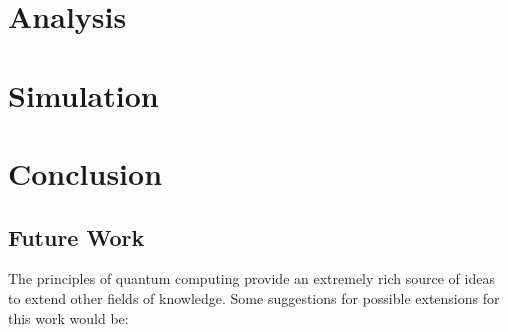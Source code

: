 \documentclass{llncs} %
\begin{document}
\section{Analysis}

\section{Simulation}


\section{Conclusion}


\subsection{Future Work}
The principles of quantum computing provide an extremely rich source of ideas to extend other fields of knowledge.
Some suggestions for possible extensions for this work would be:
\end{document}
